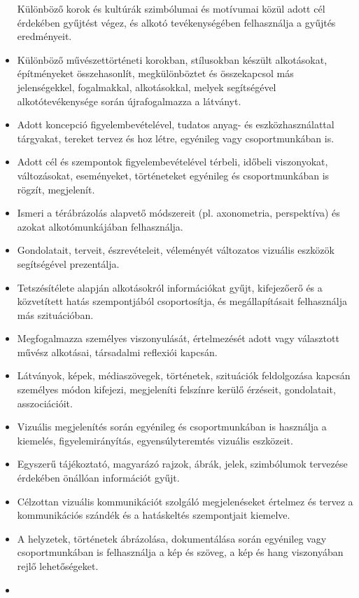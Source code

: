 \begin{itemize}
  Különböző korok és kultúrák szimbólumai és motívumai közül adott cél
  érdekében gyűjtést végez, és alkotó tevékenységében felhasználja a
  gyűjtés eredményeit.
\item
  Különböző művészettörténeti korokban, stílusokban készült alkotásokat,
  építményeket összehasonlít, megkülönböztet és összekapcsol más
  jelenségekkel, fogalmakkal, alkotásokkal, melyek segítségével
  alkotótevékenysége során újrafogalmazza a látványt.
\item
  Adott koncepció figyelembevételével, tudatos anyag- és
  eszközhasználattal tárgyakat, tereket tervez és hoz létre, egyénileg
  vagy csoportmunkában is.
\item
  Adott cél és szempontok figyelembevételével térbeli, időbeli
  viszonyokat, változásokat, eseményeket, történeteket egyénileg és
  csoportmunkában is rögzít, megjelenít.
\item
  Ismeri a térábrázolás alapvető módszereit (pl. axonometria,
  perspektíva) és azokat alkotómunkájában felhasználja.
\item
  Gondolatait, terveit, észrevételeit, véleményét változatos vizuális
  eszközök segítségével prezentálja.
\item
  Tetszésítélete alapján alkotásokról információkat gyűjt, kifejezőerő
  és a közvetített hatás szempontjából csoportosítja, és megállapításait
  felhasználja más szituációban.
\item
  Megfogalmazza személyes viszonyulását, értelmezését adott vagy
  választott művész alkotásai, társadalmi reflexiói kapcsán.
\item
  Látványok, képek, médiaszövegek, történetek, szituációk feldolgozása
  kapcsán személyes módon kifejezi, megjeleníti felszínre kerülő
  érzéseit, gondolatait, asszociációit.
\item
  Vizuális megjelenítés során egyénileg és csoportmunkában is használja
  a kiemelés, figyelemirányítás, egyensúlyteremtés vizuális eszközeit.
\item
  Egyszerű tájékoztató, magyarázó rajzok, ábrák, jelek, szimbólumok
  tervezése érdekében önállóan információt gyűjt.
\item
  Célzottan vizuális kommunikációt szolgáló megjelenéseket értelmez és
  tervez a kommunikációs szándék és a hatáskeltés szempontjait kiemelve.
\item
  A helyzetek, történetek ábrázolása, dokumentálása során egyénileg vagy
  csoportmunkában is felhasználja a kép és szöveg, a kép és hang
  viszonyában rejlő lehetőségeket.
\item

\end{itemize}
